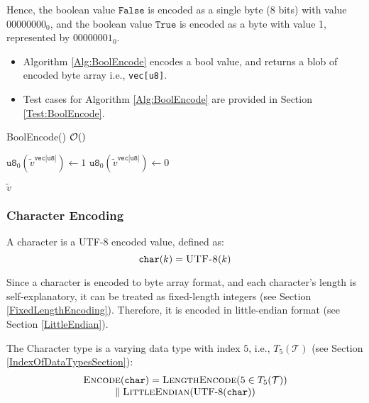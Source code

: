 \documentclass[../alan-handbook.tex]{subfiles}
\begin{document}
Hence, the boolean value $\texttt{False}$ is encoded as a single byte (8 bits) with value $00000000_0$, and the boolean value $\texttt{True}$ is encoded as a byte with value 1, represented by $00000001_0$.

 \label{BoolEncode}

\begin{itemize}
    \item Algorithm \ref{Alg:BoolEncode} encodes a bool value, and returns a blob of encoded byte array i.e., \texttt{vec[u8]}.
    \item Test cases for Algorithm \ref{Alg:BoolEncode} are provided in Section \ref{Test:BoolEncode}.
\end{itemize}

\begin{algorithm}
\caption{BoolEncode() \hfill $\mathcal{O}()$}
\label{Alg:BoolEncode}
\begin{algorithmic}[1]
        \State $\texttt{u8}_0(\tilde{v}^{\texttt{vec[u8]}}) \gets 1$
    \Else 
        \State $\texttt{u8}_0(\tilde{v}^{\texttt{vec[u8]}}) \gets 0$
    \EndIf 

    \Return $\tilde{v}$
\EndFunction
\end{algorithmic}
\end{algorithm}

\subsubsection{Character Encoding} 
\label{CharacterEncoding}

A character is a UTF-8 encoded value, defined as:
$$\texttt{char}(k) = \Call{UTF-8}{k}$$

Since a character is encoded to byte array format, and each character's length is self-explanatory, it can be treated as fixed-length integers (see Section \ref{FixedLengthEncoding}). Therefore, it is encoded in little-endian format (see Section \ref{LittleEndian}).

The Character type is a varying data type with index $5$, i.e., $T_5(\mathcal{T})$ (see Section \ref{IndexOfDataTypesSection}):
$$
\begin{matrix}
    \Call{Encode}{\texttt{char}} = \Call{LengthEncode}{5 \in T_5(\mathcal{T})} \\
    \parallel \Call{LittleEndian}{\text{UTF-8}(\texttt{char})}
\end{matrix}
$$
\end{document}
